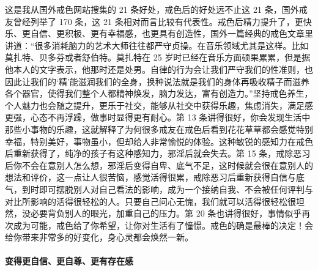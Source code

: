 这是我从国外戒色网站搜集的 21 条好处，戒色后的好处远不止这 21 条，国外戒友曾经列举了 170 条，这 21 条相对而言比较有代表性。戒色后精力提升了，更快乐、更自信、更积极、更有幸福感，也更具有创造性，国外一篇经典的戒色文章里讲道：“很多消耗脑力的艺术大师往往都严守贞操。在音乐领域尤其是这样。比如莫扎特、贝多芬或者舒伯特。莫扎特在 25 岁时已经在音乐方面硕果累累，但是据他本人的文字表示，他那时还是处男。自律的行为会让我们严守我们的性准则，也因此让我们的‘精’能滋润我们的全身，换种说法就是我们的身体再吸收精子而滋养各个器官，使得我们整个人都精神焕发，脑力发达，富有创造力。”坚持戒色养生，个人魅力也会随之提升，更乐于社交，能够从社交中获得乐趣，焦虑消失，满足感更强，心态不再浮躁，做事时显得更有耐心。第 13 条讲得很好，你会发现生活中那些小事物的乐趣，这就解释了为何很多戒友在戒色后看到花花草草都会感觉特别幸福，特别美好，事物虽小，但却给人非常愉悦的体验。这种敏锐的感知力在戒色后重新获得了，纯净的孩子有这种感知力，邪淫后就会失去。第 15 条，戒除恶习后你不会在意别人怎么想，邪淫后变得自卑、底气不足，这时候就会很在意别人的想法和评价，这一点让人很苦恼，感觉活得很累，戒除恶习后重新获得自信与底气，到时即可摆脱别人对自己看法的影响，成为一个接纳自我、不会被任何评判与对比所影响的活得很轻松的人。只要自己问心无愧，我们就可以活得很轻松很坦然，没必要背负别人的眼光，加重自己的压力。第 20 条也讲得很好，事情似乎再次成为可能，戒色给了你希望，让你对生活有了憧憬。戒色的确是最棒的决定！会给你带来非常多的好变化，身心灵都会焕然一新。

\paragraph{变得更自信、更自尊、更有存在感}

